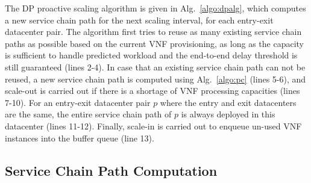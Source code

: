 The DP proactive scaling algorithm is given in Alg.~\ref{algo:dpalg}, which computes a new service chain path for the next scaling interval, for each entry-exit datacenter pair. %
The algorithm first tries to reuse as many existing service chain paths as possible based on the current VNF provisioning, as long as the capacity is sufficient to handle predicted workload and the end-to-end delay threshold is still guaranteed (lines 2-4). In case that an existing service chain path can not be reused, a new service chain path is computed using Alg.~\ref{algo:pc} (lines 5-6), and scale-out is carried out if there is a shortage of VNF processing capacities (lines 7-10). For an entry-exit datacenter pair $p$ where the entry and exit datacenters are the same, the entire service chain path of $p$ is always deployed in this datacenter (lines 11-12). %
Finally, scale-in is carried out to enqueue un-used VNF instances into the buffer queue (line 13).




\subsection{Service Chain Path Computation}
\label{sec:pathcomp}


